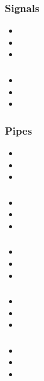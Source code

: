 \documentclass[pdftex]{beamer} %
\begin{document}
\begin{frame}
  \frametitle{Signals}
  \begin{itemize}
  \item 
  \item 
  \item 
  \end{itemize}
\end{frame}

\begin{frame}
  \frametitle{}
  \begin{itemize}
  \item 
  \item 
  \item 
  \end{itemize}
\end{frame}

\begin{frame}
  \frametitle{Pipes}
  \begin{itemize}
  \item 
  \item 
  \item 
  \end{itemize}
\end{frame}

\begin{frame}
  \frametitle{}
  \begin{itemize}
  \item 
  \item 
  \item 
  \end{itemize}
\end{frame}

\begin{frame}
  \frametitle{}
  \begin{itemize}
  \item 
  \item 
  \item 
  \end{itemize}
\end{frame}

\begin{frame}
  \frametitle{}
  \begin{itemize}
  \item 
  \item 
  \item 
  \end{itemize}
\end{frame}

\begin{frame}
  \frametitle{}
  \begin{itemize}
  \item 
  \item 
  \item 
  \end{itemize}
\end{frame}
\end{document}

